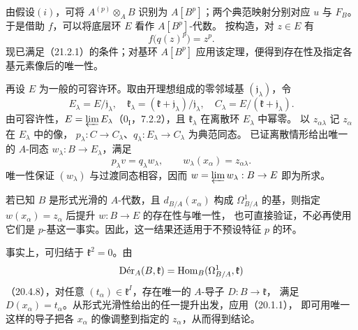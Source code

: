 由假设$(i)$，可将 $A^{(p)}\otimes_A B$ 识别为 $A[B^p]$；两个典范映射分别对应 $u$ 与 $F_B$。
于是借助 $f$，可以将底层环 $E$ 看作 $A[B^p]$-代数。
按构造，对 $z\in E$ 有
\[
 f\bigl(q(z)^p\bigr)=z^p.
\]
现已满足（21.2.1）的条件；对基环 $A[B^p]$ 应用该定理，便得到存在性及指定各基元素像后的唯一性。

再设 $E$ 为一般的可容许环。取由开理想组成的零邻域基 $(\mathfrak j_\lambda)$，令
\[
 E_\lambda=E/\mathfrak j_\lambda,\quad
 \mathfrak k_\lambda=(\mathfrak k+\mathfrak j_\lambda)/\mathfrak j_\lambda,
 \quad C_\lambda=E/(\mathfrak k+\mathfrak j_\lambda).
\]
由可容许性，$E=\varprojlim E_\lambda$（$0_{\mathrm I}$，7.2.2），且
$\mathfrak k_\lambda$ 在离散环 $E_\lambda$ 中幂零。
以 $z_{\alpha\lambda}$ 记 $z_\alpha$ 在 $E_\lambda$ 中的像，
$p_\lambda:C\to C_\lambda$、$q_\lambda:E_\lambda\to C_\lambda$ 为典范同态。
已证离散情形给出唯一的 $A$-同态 $w_\lambda:B\to E_\lambda$，满足
\[
 p_\lambda v=q_\lambda w_\lambda,
 \qquad w_\lambda(x_\alpha)=z_{\alpha\lambda}.
\]
唯一性保证 $(w_\lambda)$ 与过渡同态相容，因而
$w=\varprojlim w_\lambda:B\to E$ 即为所求。
\finishproof

若已知 $B$ 是形式光滑的 $A$-代数，且 $d_{B/A}(x_\alpha)$ 构成
$\Omega^1_{B/A}$ 的基，则指定 $w(x_\alpha)=z_\alpha$ 后提升 $w:B\to E$ 的存在性与唯一性，
也可直接验证，不必再使用它们是 $p$-基这一事实。因此，这一结果还适用于不预设特征 $p$ 的环。

事实上，可归结于 $\mathfrak k^2=0$。由
\[
 \Der_A(B,\mathfrak k)=\Hom_B(\Omega^1_{B/A},\mathfrak k)
\]
（20.4.8），对任意 $(t_\alpha)\in\mathfrak k^I$，存在唯一的 $A$-导子 $D:B\to\mathfrak k$，
满足 $D(x_\alpha)=t_\alpha$。从形式光滑性给出的任一提升出发，应用（20.1.1），
即可用唯一这样的导子把各 $x_\alpha$ 的像调整到指定的 $z_\alpha$，从而得到结论。
